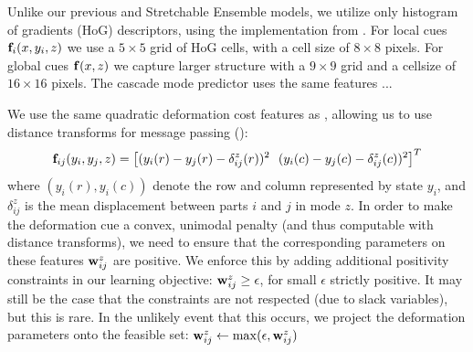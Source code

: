 Unlike our previous \CPS and Stretchable Ensemble models, we utilize only 
histogram of gradients (HoG) descriptors, using the implementation from
\citet{dpm}.  For local cues $\mathbf{f}_i(x,y_i,z)$ we use a $5 \times 5$ grid of HoG 
cells, with a cell size of $8 \times 8$ pixels. For global cues $\mathbf{f}(x,z)$ we 
capture larger structure with a $9 \times 9$ grid and a cellsize of 
$16 \times 16$ pixels.   The cascade mode predictor uses the same features ...

 We use the same quadratic deformation cost features as \citet{felz05}, allowing us to use
distance transforms for message passing ():
$$
\mathbf{f}_{ij}(y_i,y_j,z) = \left[(y_i(r) - y_j(r) - \delta_{ij}^z(r))^2~~(y_i(c) - y_j(c) - \delta_{ij}^z(c))^2\right]^T
$$
where $(y_i(r),y_i(c))$ denote the row and column represented by state $y_i$, 
and $\delta_{ij}^z$ is the mean displacement between parts $i$ and $j$ in mode 
$z$.  In order to make the deformation cue a convex, unimodal penalty (and thus 
computable with distance transforms), we need to ensure that the corresponding 
parameters on these features $\mathbf{w}_{ij}^z$ are positive. We enforce this by 
adding additional positivity constraints in our learning objective: $\mathbf{w}_{ij}^z 
\geq \epsilon$, for small $\epsilon$ strictly positive.  It may still be the 
case that the constraints are not respected (due to slack variables), but this 
is rare.  In the unlikely event that this occurs, we project the deformation 
parameters onto the feasible set: $\mathbf{w}_{ij}^z \leftarrow 
\max(\epsilon,\mathbf{w}_{ij}^z)$ 

